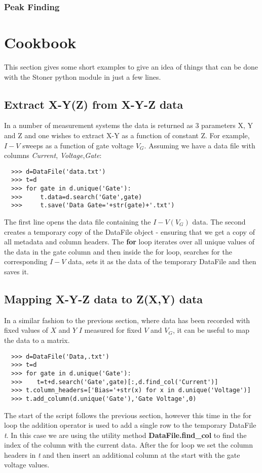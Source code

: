 \documentclass[a4paper,11pt]{scrartcl}
\begin{document}
\subsubsection{Peak Finding}

\section{Cookbook}

This section gives some short examples to give an idea of things that can be done with the Stoner python module in just a few lines.

\subsection{Extract X-Y(Z) from X-Y-Z data}

In a number of measurement systems the data is returned as 3 parameters X, Y and Z and one wishes to extract X-Y as a function of constant Z. For example, $I-V$ sweeps as a function of gate voltage $V_G$. Assuming we have a data file with columns \textit{Current}, \textit{Voltage},\textit{Gate}:

\begin{verbatim}
  >>> d=DataFile('data.txt')
  >>> t=d
  >>> for gate in d.unique('Gate'):
  >>>     t.data=d.search('Gate',gate)
  >>>     t.save('Data Gate='+str(gate)+'.txt')
\end{verbatim}

The first line opens the data file containing the $I-V(V_G)$ data. The second creates a temporary copy of the DataFile object - ensuring that we get a copy of all metadata and column headers. The \textbf{for} loop iterates over all unique values of the data in the gate column and then inside the for loop, searches for the corresponding $I-V$ data, sets it as the data of the temporary DataFile and then saves it.

\subsection{Mapping X-Y-Z data to Z(X,Y) data}

In a similar fashion to the previous section, where data has been recorded with fixed values of $X$ and $Y$ \eg $I$ measured for fixed $V$ and $V_G$, it can be useful to map the data to a matrix.

\begin{verbatim}
  >>> d=DataFile('Data,.txt')
  >>> t=d
  >>> for gate in d.unique('Gate'):
  >>>    t=t+d.search('Gate',gate)[:,d.find_col('Current')]
  >>> t.column_headers=['Bias='+str(x) for x in d.unique('Voltage')]
  >>> t.add_column(d.unique('Gate'),'Gate Voltage',0)
\end{verbatim}

The start of the script follows the previous section, however this time in the for loop the addition operator is used to add a single row to the temporary DataFile \textit{t}. In this case we are using the utility method \textbf{DataFile.find\_col} to find the index of the column with the current data. After the for loop we set the column headers in \textit{t} and then insert an additional column at the start with the gate voltage values.
\end{document}
